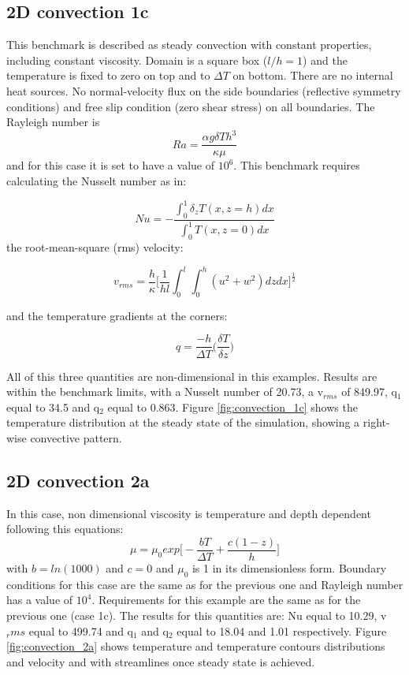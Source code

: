 \subsection{2D convection 1c}
This benchmark is described as steady convection with constant properties, including constant viscosity. Domain is a square box ($l/h = 1$) and the temperature is fixed to zero on top and to $\Delta T$ on bottom. There are no internal heat sources. No normal-velocity flux on the side boundaries (reflective symmetry conditions) and free slip condition (zero shear stress) on all boundaries. The Rayleigh number is
\begin{equation}
	Ra = \frac{\alpha g \delta T h^3}{\kappa \mu}
\end{equation}
and for this case it is set to have a value of $10^6$.
This benchmark requires calculating the Nusselt number as in:

\begin{equation}
	Nu = -\frac{\int_{0}^{1}\delta_zT(x,z=h)dx}{\int_{0}^{1}T(x,z=0)dx}
\end{equation}
the root-mean-square (rms) velocity:

\begin{equation}
	v_{rms} = \frac{h}{\kappa} \bigg[\frac{1}{hl}\int_{0}^{l}\int_{0}^{h}(u^2+w^2)dzdx\bigg]^{\frac{1}{2}}
\end{equation}

and the temperature gradients at the corners:

\begin{equation}
	q = \frac{-h}{\Delta T}\bigg(\frac{\delta T}{\delta z}\bigg)
\end{equation}

All of this three quantities are non-dimensional in this examples. Results are within the benchmark limits, with a Nusselt number of 20.73, a v$_{rms}$ of 849.97, q$_1$ equal to 34.5 and q$_2$ equal to 0.863.  
Figure \ref{fig:convection_1c} shows the temperature distribution at the steady state of the simulation, showing a right-wise convective pattern.


\subsection{2D convection 2a}
In this case, non dimensional viscosity is temperature and depth dependent following this equations:
\begin{equation}
	\mu = \mu_0 exp\bigg[-\frac{bT}{\Delta T} + \frac{c(1-z)}{h}\bigg]
\end{equation}
with $b = ln(1000)$ and $c = 0$ and $\mu_0$ is 1 in its dimensionless form. Boundary conditions for this case are the same as for the previous one and Rayleigh number has a value of $10^4$. Requirements for this example are the same as for the previous one (case 1c).
The results for this quantities are: Nu equal to 10.29, v$_rms$ equal to 499.74 and q$_1$ and q$_2$ equal to 18.04 and 1.01 respectively. 
Figure \ref{fig:convection_2a} shows temperature and temperature contours distributions and velocity and with streamlines once steady state is achieved. 

